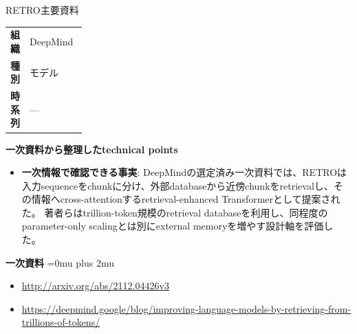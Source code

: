 \begin{technicalnote}{RETRO}{主要資料}
\begingroup
\begin{tabularx}{\linewidth}{@{}>{\bfseries}p{0.22\linewidth}X@{}}
組織 & DeepMind \\
種別 & モデル \\
時系列 & — \\
\end{tabularx}
\smallskip
{\bfseries 一次資料から整理したtechnical points}
\begin{itemize}[leftmargin=1.5em,itemsep=0.35em]
\item \textbf{一次情報で確認できる事実}: DeepMindの選定済み一次資料では、RETROは入力sequenceをchunkに分け、外部databaseから近傍chunkをretrievalし、その情報へcross-attentionするretrieval-enhanced Transformerとして提案された。 著者らはtrillion-token規模のretrieval databaseを利用し、同程度のparameter-only scalingとは別にexternal memoryを増やす設計軸を評価した。
\end{itemize}
\begin{minipage}{\linewidth}
\begin{samepage}
{\bfseries 一次資料}
\begingroup\sloppy
\Urlmuskip=0mu plus 2mu\relax
\begin{itemize}[leftmargin=1.5em,itemsep=0.25em]
\item {\scriptsize\url{http://arxiv.org/abs/2112.04426v3}}
\item {\scriptsize\url{https://deepmind.google/blog/improving-language-models-by-retrieving-from-trillions-of-tokens/}}
\end{itemize}
\endgroup
\end{samepage}
\end{minipage}
\endgroup
\end{technicalnote}
\medskip

